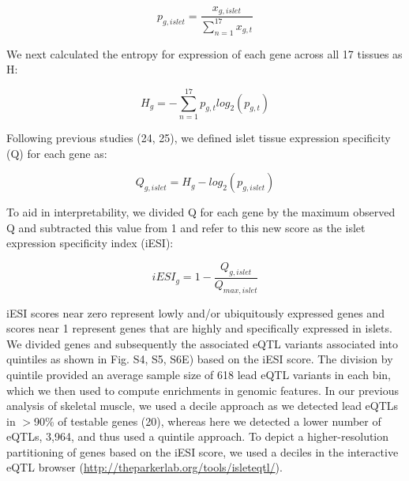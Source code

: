 \[ p_{g,islet} = \frac{x_{g,islet}}{\sum_{n=1}^{17}x_{g,t}}  \]

We next calculated the entropy for expression of each gene across all 17 tissues as H:

\[ H_g = -\sum_{n=1}^{17}p_{g,t} log_2(p_{g,t}) \]

Following previous studies (24, 25), we defined islet tissue expression specificity (Q) for each gene as:

\[ Q_{g,islet} = H_g - log_2(p_{g,islet}) \]

To aid in interpretability, we divided Q for each gene by the maximum observed Q and subtracted this value from 1 and refer to this new score as the islet expression specificity index (iESI):

\[ iESI_g = 1 - \frac{Q_{g,islet}}{Q_{max,islet}} \]

iESI scores near zero represent lowly and/or ubiquitously expressed genes and scores near 1 represent genes that are highly and specifically expressed in islets. We divided genes and subsequently the associated eQTL variants associated into quintiles as shown in Fig. S4, S5, S6E) based on the iESI score. The division by quintile provided an average sample size of 618 lead eQTL variants in each bin, which we then used to compute enrichments in genomic features. In our previous analysis of skeletal muscle, we used a decile approach as we detected lead eQTLs in $>$90\% of testable genes (20), whereas here we detected a lower number of eQTLs, 3,964, and thus used a quintile approach. To depict a higher-resolution partitioning of genes based on the iESI score, we used a deciles in the interactive eQTL browser (\url{http://theparkerlab.org/tools/isleteqtl/}).

